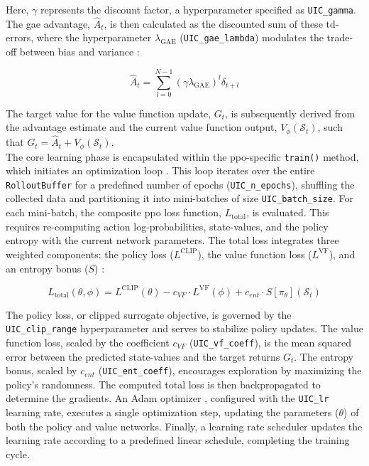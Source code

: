 Here, $\gamma$ represents the discount factor, a hyperparameter specified as \texttt{UIC\_gamma}.
The \gls{gae} advantage, $\hat{A}_t$, is then calculated as the discounted sum of these \glspl{td-error}, where the hyperparameter $\lambda_{\text{GAE}}$ (\texttt{UIC\_gae\_lambda}) modulates the trade-off between bias and variance \cite{schulman_high-dimensional_2018}:

\begin{equation}
    \hat{A}_t = \sum_{l=0}^{N-1} (\gamma \lambda_{\text{GAE}})^l \delta_{t+l}
    \label{eq:uic_gae_revised}
\end{equation}

The target value for the value function update, $G_t$, is subsequently derived from the advantage estimate and the current value function output, $V_{\phi}(\mathcal{S}_t)$, such that $G_t = \hat{A}_t + V_{\phi}(\mathcal{S}_t)$.\\

The core learning phase is encapsulated within the \gls{ppo}-specific \texttt{train()} method, which initiates an optimization loop \cite{raffin_stable-baselines3_2021}.
This loop iterates over the entire \texttt{RolloutBuffer} for a predefined number of epochs (\texttt{UIC\_n\_epochs}), shuffling the collected data and partitioning it into mini-batches of size \texttt{UIC\_batch\_size}.
For each mini-batch, the composite \gls{ppo} loss function, $L_{\text{total}}$, is evaluated.
This requires re-computing action log-probabilities, state-values, and the policy entropy with the current network parameters.
The total loss integrates three weighted components: the policy loss ($L^{\text{CLIP}}$), the value function loss ($L^{\text{VF}}$), and an entropy bonus ($S$) \cite{schulman_proximal_2017}:

\begin{equation}
    L_{\text{total}}(\theta, \phi) = L^{\text{CLIP}}(\theta) - c_{VF} \cdot L^{\text{VF}}(\phi) + c_{ent} \cdot S[\pi_{\theta}](\mathcal{S}_t)
    \label{eq:uic_total_loss_revised}
\end{equation}

The policy loss, or clipped surrogate objective, is governed by the \texttt{UIC\_clip\_range} hyperparameter and serves to stabilize policy updates.
The value function loss, scaled by the coefficient $c_{VF}$ (\texttt{UIC\_vf\_coeff}), is the mean squared error between the predicted state-values and the target returns $G_t$.
The entropy bonus, scaled by $c_{ent}$ (\texttt{UIC\_ent\_coeff}), encourages exploration by maximizing the policy's randomness.
The computed total loss is then backpropagated to determine the gradients.
An Adam optimizer \cite{kingma_adam_2017}, configured with the \texttt{UIC\_lr} learning rate, executes a single optimization step, updating the parameters ($\theta$) of both the policy and value networks.
Finally, a learning rate scheduler updates the learning rate according to a predefined linear schedule, completing the training cycle.

